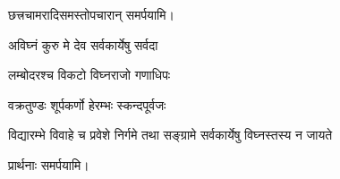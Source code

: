 \centerline{छत्त्रचामरादिसमस्तोपचारान् समर्पयामि।}

{अविघ्नं कुरु मे देव सर्वकार्येषु सर्वदा}

{लम्बोदरश्च विकटो विघ्नराजो गणाधिपः}

{वक्रतुण्डः शूर्पकर्णो हेरम्भः स्कन्दपूर्वजः}

{विद्यारम्भे विवाहे च प्रवेशे निर्गमे तथा}
{सङ्ग्रामे सर्वकार्येषु विघ्नस्तस्य न जायते}

\centerline{प्रार्थनाः समर्पयामि।}

\closesub